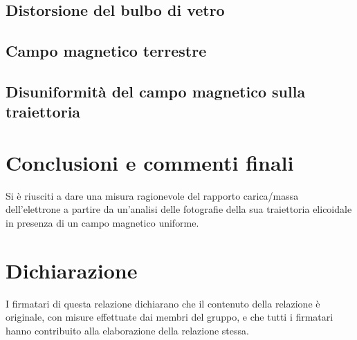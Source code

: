 \documentclass[10pt, a4paper, italian]{article}
\begin{document}
\subsection{Distorsione del bulbo di vetro}

\subsection{Campo magnetico terrestre}

\subsection{Disuniformità del campo magnetico sulla traiettoria}

\section*{Conclusioni e commenti finali}
Si è riusciti a dare una misura ragionevole del rapporto carica/massa
dell'elettrone a partire da un'analisi delle fotografie della sua traiettoria
elicoidale in presenza di un campo magnetico uniforme.

\section*{Dichiarazione}
I firmatari di questa relazione dichiarano che il contenuto della relazione \`e
originale, con misure effettuate dai membri del gruppo, e che tutti i firmatari
hanno contribuito alla elaborazione della relazione stessa.

\begin{thebibliography}{1}
\end{thebibliography}
\end{document}
